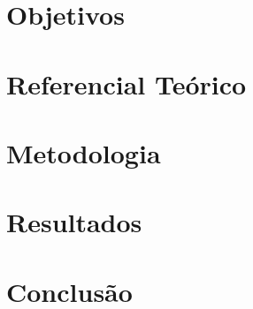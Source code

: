 \documentclass[12pt, a4paper, twoside]{article}
\numberwithin{equation}{subsection} %
\begin{document}
\newpage

\section{\textbf{Objetivos}}


\newpage
%

\newpage

\section{\textbf{Referencial Teórico}}


\newpage



\section{\textbf{Metodologia}}


\newpage

%

\newpage
\section{\textbf{Resultados}}


\newpage

\section{\textbf{Conclusão}}

%
%
%




%
%
%
%
\end{document}
